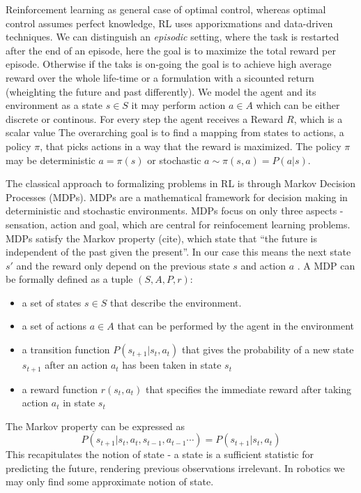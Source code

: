 Reinforcement learning as general case of optimal control, whereas optimal control
assumes perfect knowledge, RL uses apporixmations and data-driven techniques.
We can distinguish an \textit{episodic} setting, where the task is restarted after
the end of an episode, here the goal is to maximize the total reward per episode.
Otherwise if the taks is on-going the goal is to achieve high average reward over
the whole life-time or a formulation with a sicounted return (wheighting the
future and past differently).
We model the agent and its environment as a state $s \in S$ it may perform action
$ a \in A$ which can be either discrete or continous.
For every step the agent receives a Reward $R$, which is a scalar value
The overarching goal is to find a mapping from states to actions, a policy $\pi$,
that picks actions in a way that the reward is maximized. The policy $\pi$ may
be deterministic $a = \pi(s)$ or stochastic $a \sim \pi(s,a) = P(a | s)$.

The classical approach to formalizing problems in RL is through
Markov Decision Processes (MDPs).
MDPs are a mathematical
framework for decision making in deterministic and stochastic environments.
MDPs focus on only three aspects - sensation, action and goal, which are central
for reinfocement learning problems.
MDPs satisfy the Markov property (cite), which state that ``the future is independent
of the past given the present''. In our case this means the next state $s'$ and the reward
only depend on the previous state $s$ and action $a$ \citet{sutton1992reinforcement}.
A MDP can be formally defined as a tuple $(S, A, P, r)$:

\begin{itemize}
\item a set of states $s \in S$ that describe the environment.
\item a set of actions $a \in A$ that can be performed by the agent in the environment
\item a transition function $P(s_{t+1} | s_t, a_t)$ that gives the probability of a new
  state $s_{t+1}$ after an action $a_t$ has been taken in state $s_t$
\item a reward function $r(s_t, a_t)$ that specifies the immediate reward after taking action
  $a_t$ in state $s_t$
\end{itemize}

The Markov property can be expressed as
$$ P(s_{t+1} | s_t, a_t, s_{t-1}, a_{t-1}\cdots) = P(s_{t+1} | s_t, a_t)$$
This recapitulates the notion of state - a state is a sufficient statistic
for predicting the future, rendering previous observations irrelevant.
In robotics we may only find some approximate notion of state.

